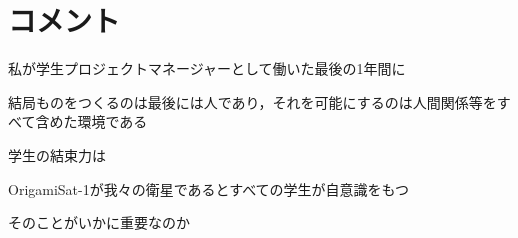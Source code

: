 \section{コメント}



私が学生プロジェクトマネージャーとして働いた最後の1年間に

結局ものをつくるのは最後には人であり，それを可能にするのは人間関係等をすべて含めた環境である

学生の結束力は


OrigamiSat-1が我々の衛星であるとすべての学生が自意識をもつ

そのことがいかに重要なのか